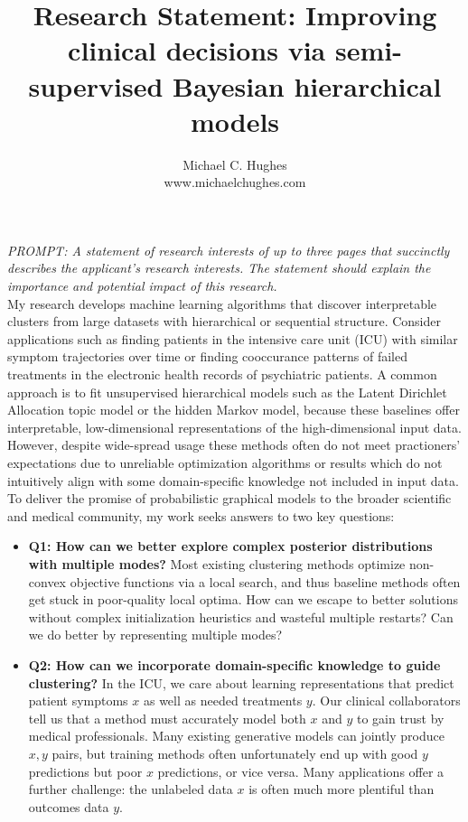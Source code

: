 \documentclass[11pt,letterpaper,sans]{article}
\title{Research Statement: Improving clinical decisions via semi-supervised Bayesian hierarchical models}
\author{Michael C. Hughes \\ www.michaelchughes.com}
\begin{document}
\maketitle

\emph{PROMPT: A statement of research interests of up to three pages that succinctly describes the applicant's research interests. The statement should explain the importance and potential impact of this research.}
\\

My research develops machine learning
algorithms that discover interpretable clusters from large datasets with hierarchical or sequential structure.
Consider applications such as 
finding patients in the intensive care unit (ICU) with similar symptom trajectories over time 
or
finding cooccurance patterns of 
failed treatments
in the electronic health records of psychiatric patients.
A common approach is to fit unsupervised hierarchical models such as the 
Latent Dirichlet Allocation 
topic model or the hidden Markov model, because these baselines offer interpretable, low-dimensional representations of the high-dimensional input data.
However, despite wide-spread usage these methods often do not meet practioners' expectations due to
unreliable optimization algorithms
or 
results which do not intuitively align
with some domain-specific knowledge not included in input data.
To deliver the promise of probabilistic graphical models to the broader scientific and medical community, my work seeks answers to two key questions:

\begin{itemize}

\item \textbf{Q1: How can we better explore 
complex posterior distributions with multiple modes?} Most existing clustering methods optimize non-convex objective functions via a local search, and thus baseline methods often get stuck in poor-quality local optima.
How can we escape to better solutions without complex initialization heuristics and wasteful multiple restarts?
Can we do better by representing multiple modes? 

\item \textbf{Q2: How can we incorporate domain-specific knowledge to guide clustering?} In the ICU, we care about learning representations that predict patient symptoms $x$ as well as needed treatments $y$. Our clinical collaborators tell us that a method must accurately model both $x$ and $y$ to gain trust by medical professionals. Many existing generative models can jointly produce $x,y$ pairs, but training methods often unfortunately end up with good $y$ predictions but poor $x$ predictions, or vice versa. Many applications offer a further challenge: the unlabeled data $x$ is often much more plentiful than outcomes data $y$.
\end{itemize}
\end{document}
